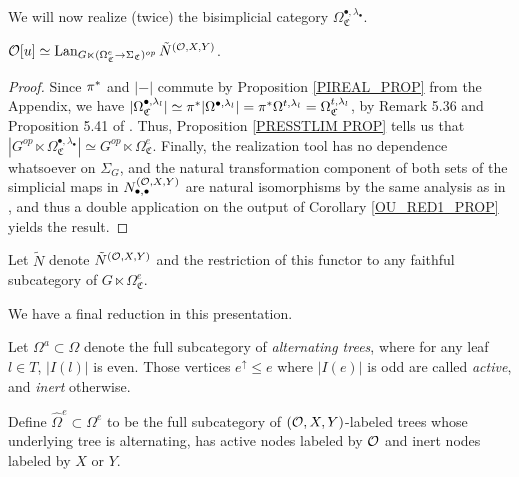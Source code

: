 \documentclass[a4paper,10pt
,draft
]{article}%
\renewcommand{\hat}{\widehat}
\renewcommand{\1}{\eta}%
\newcommand{\SC}{\Sigma_{\mathfrak C}}
\newcommand{\OC}{\Omega_{\mathfrak C}}
\begin{document}
We will now realize (twice) the bisimplicial category $\OC^{\bullet, \lambda_\bullet}$.

\begin{proposition}
      \label{OU_RED2_PROP}
      $\O[u] \simeq \Lan_{G \ltimes (\OC^{e} \to \SC)^{op}} \tilde N^{(\O,X,Y)}$.
\end{proposition}
\begin{proof}
      Since $\pi^{\**}$ and $|-|$ commute by Proposition \ref{PIREAL_PROP} from the Appendix,
      we have
      $|\OC^{\bullet, \lambda_l}| \simeq \pi^{\**} |\Omega^{\bullet, \lambda_l}| = \pi^{\**} \Omega^{t, \lambda_l} = \OC^{t, \lambda_l}$,
      by Remark 5.36 and Proposition 5.41 of \cite{BP_geo}.
      Thus, Proposition \ref{PRESSTLIM PROP} tells us that
      $|G^{op} \ltimes \OC^{\bullet, \lambda_\bullet}| \simeq G^{op} \ltimes \OC^e$.
      Finally, the realization tool \cite[Prop. 5.37]{BP_geo} has no dependence whatsoever on $\Sigma_G$,
      and the natural transformation component of both sets of the simplicial maps in $N_{\bullet, \bullet}^{(\mathcal{O},X,Y)}$ are natural isomorphisms by the same analysis as in \cite{BP_geo},
      and thus a double application on the output of Corollary \ref{OU_RED1_PROP} yields the result.
\end{proof}

\begin{notation}
      Let $\tilde N$ denote $\tilde N^{(\mathcal{O},X,Y)}$ and the restriction of this functor to any faithful subcategory of $G \ltimes \OC^e$.
\end{notation}

We have a final reduction in this presentation.
\begin{definition}
      Let $\Omega^a \subset \Omega$ denote the full subcategory of \textit{alternating trees}, where for any leaf $l \in T$, $|I(l)|$ is even.
      Those vertices $e^{\uparrow} \leq e$ where $|I(e)|$ is odd are called \textit{active}, and \textit{inert} otherwise.

      Define $\hat\Omega^e \subset \Omega^e$ to be the full subcategory of $(\mathcal{O},X,Y)$-labeled trees whose
      underlying tree is alternating, has active nodes labeled by $\mathcal{O}$ and inert nodes labeled by $X$ or $Y$.      
\end{definition}


\end{document}
